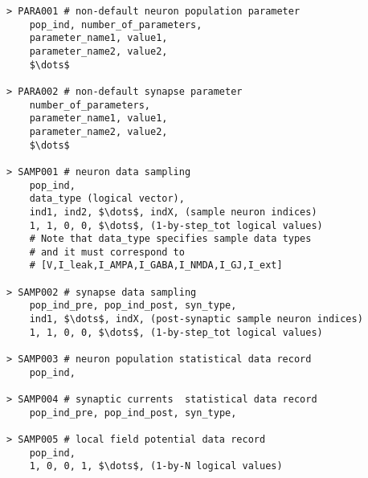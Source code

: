 \documentclass{article}
\begin{document}
\begin{lstlisting}[mathescape]
> PARA001 # non-default neuron population parameter
	pop_ind, number_of_parameters,
	parameter_name1, value1,
	parameter_name2, value2,
	$\dots$
 
> PARA002 # non-default synapse parameter
	number_of_parameters,
	parameter_name1, value1,
	parameter_name2, value2,
	$\dots$

> SAMP001 # neuron data sampling 
	pop_ind,
	data_type (logical vector),
	ind1, ind2, $\dots$, indX, (sample neuron indices)
	1, 1, 0, 0, $\dots$, (1-by-step_tot logical values)
	# Note that data_type specifies sample data types
	# and it must correspond to 
	# [V,I_leak,I_AMPA,I_GABA,I_NMDA,I_GJ,I_ext]

> SAMP002 # synapse data sampling 
	pop_ind_pre, pop_ind_post, syn_type,
	ind1, $\dots$, indX, (post-synaptic sample neuron indices)
	1, 1, 0, 0, $\dots$, (1-by-step_tot logical values)
	
> SAMP003 # neuron population statistical data record
	pop_ind,
	
> SAMP004 # synaptic currents  statistical data record
	pop_ind_pre, pop_ind_post, syn_type,

> SAMP005 # local field potential data record
	pop_ind,
	1, 0, 0, 1, $\dots$, (1-by-N logical values)
	
\end{lstlisting}
\end{document}
